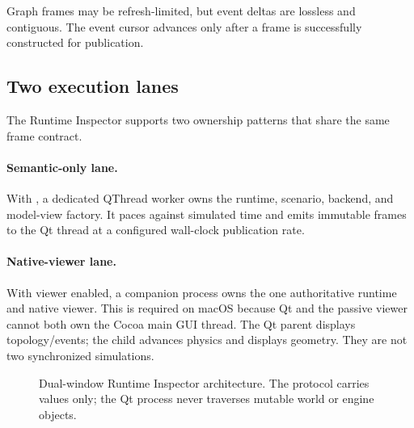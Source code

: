 Graph frames may be refresh-limited, but event deltas are lossless and contiguous. The
event cursor advances only after a frame is successfully constructed for publication.

\subsection{Two execution lanes}

The Runtime Inspector supports two ownership patterns that share the same frame
contract.

\paragraph{Semantic-only lane.}
With , a dedicated QThread worker owns the runtime, scenario,
backend, and model-view factory. It paces against simulated time and emits immutable
frames to the Qt thread at a configured wall-clock publication rate.

\paragraph{Native-viewer lane.}
With \mujoco{} viewer enabled, a companion process owns the one authoritative runtime
and native viewer. This is required on macOS because Qt and the passive \mujoco{} viewer
cannot both own the Cocoa main GUI thread. The Qt parent displays topology/events; the
child advances physics and displays geometry. They are not two synchronized
simulations.

\begin{figure}[htbp]
\centering
{}
\caption{Dual-window Runtime Inspector architecture. The protocol carries values only;
the Qt process never traverses mutable world or engine objects.}
\label{fig:runtime-processes}
\end{figure}


